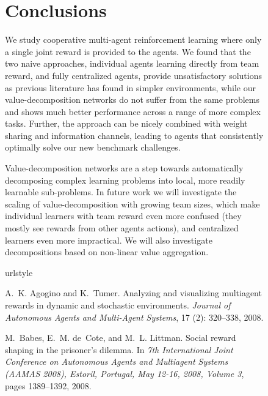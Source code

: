 \documentclass{article}
\begin{document}
\begin{SCfigure}
\section{Conclusions}
We study cooperative multi-agent reinforcement learning where only a single joint reward is provided to the agents. We found that the two naive approaches, individual agents learning directly from team reward, and fully centralized agents, provide unsatisfactory solutions as previous literature has found in simpler environments, while our value-decomposition networks do not suffer from the same problems and shows much better performance across a range of more complex tasks. Further, the approach can be nicely combined with weight sharing and information channels, leading to agents that consistently optimally solve our new benchmark challenges. 





Value-decomposition networks are a step towards automatically decomposing complex learning problems into local, more readily learnable sub-problems. In future work we will investigate the scaling of value-decomposition with growing team sizes, which make individual learners with team reward even more confused (they mostly see rewards from other agents actions), and centralized learners even more impractical. We will also investigate decompositions based on non-linear value aggregation.

\FloatBarrier




\begin{thebibliography}{40}
\providecommand{\natexlab}[1]{#1}
\providecommand{\url}[1]{\texttt{#1}}
\expandafter\ifx\csname urlstyle\endcsname\relax
  \providecommand{\doi}[1]{doi: #1}\else
  \providecommand{\doi}{doi: \begingroup \urlstyle{rm}\Url}\fi

A.~K. Agogino and K.~Tumer.
\newblock Analyzing and visualizing multiagent rewards in dynamic and
  stochastic environments.
\newblock \emph{Journal of Autonomous Agents and Multi-Agent Systems},
  17 (2): 320--338, 2008.

M.~Babes, E.~M. de~Cote, and M.~L. Littman.
\newblock Social reward shaping in the prisoner's dilemma.
\newblock In \emph{7th International Joint Conference on Autonomous Agents and
  Multiagent Systems {(AAMAS} 2008), Estoril, Portugal, May 12-16, 2008, Volume
  3}, pages 1389--1392, 2008.


\end{thebibliography}
\end{SCfigure}
\end{document}
